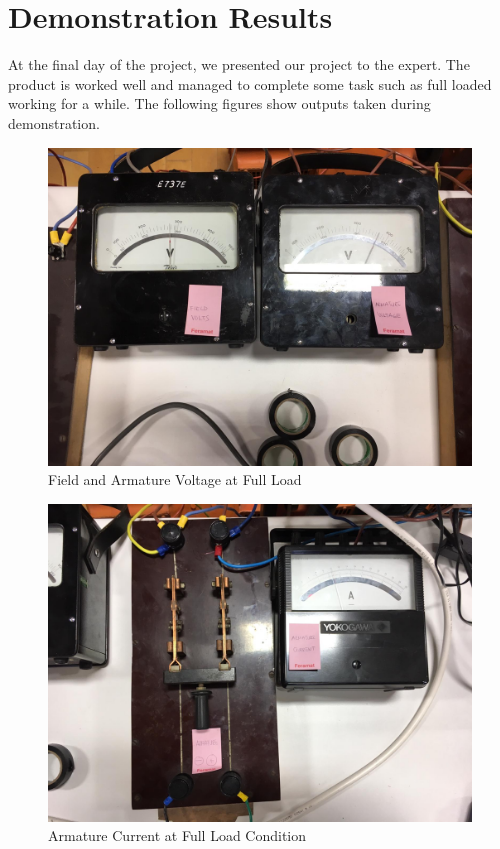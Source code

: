 \documentclass{article}
\begin{document}
\section{Demonstration Results}%
At the final day of the project, we presented our project to the expert. The product is worked well and managed to complete some task such as full loaded working for a while. The following figures show outputs taken during demonstration. 
\begin{figure}[H]
\centering
\includegraphics[scale=0.1]{demofield.jpg}
\caption{Field and Armature Voltage at Full Load}
\label{fig:members}
\end{figure}

\begin{figure}[H]
\centering
\includegraphics[scale=0.1]{demoarmaturecurrent}
\caption{Armature Current at Full Load Condition  }
\label{fig:members}
\end{figure}
\end{document}
